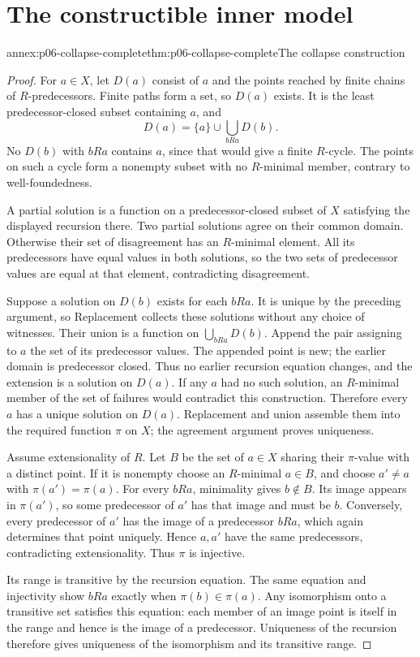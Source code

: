 \section{The constructible inner model}
\label{sec:annex-p06-constructible-inner-model-completion}

\begin{annexitem}{annex:p06-collapse-complete}{thm:p06-collapse-complete}{The collapse construction}
\begin{proof}
For \(a\in X\), let \(D(a)\) consist of \(a\) and the points reached
by finite chains of \(R\)-predecessors.
Finite paths form a set, so \(D(a)\) exists.
It is the least predecessor-closed subset containing \(a\), and
\[
 D(a)=\{a\}\cup\bigcup_{bRa}D(b).
\]
No \(D(b)\) with \(bRa\) contains \(a\), since that would give a
finite \(R\)-cycle. The points on such a cycle form a nonempty
subset with no \(R\)-minimal member, contrary to well-foundedness.

A partial solution is a function on a predecessor-closed subset
of \(X\) satisfying the displayed recursion there.
Two partial solutions agree on their common domain.
Otherwise their set of disagreement has an \(R\)-minimal element.
All its predecessors have equal values in both solutions, so the
two sets of predecessor values are equal at that element,
contradicting disagreement.

Suppose a solution on \(D(b)\) exists for each \(bRa\).
It is unique by the preceding argument, so Replacement collects
these solutions without any choice of witnesses.
Their union is a function on \(\bigcup_{bRa}D(b)\).
Append the pair assigning to \(a\) the set of its predecessor values.
The appended point is new; the earlier domain is predecessor closed.
Thus no earlier recursion equation changes, and the extension is
a solution on \(D(a)\).
If any \(a\) had no such solution, an \(R\)-minimal member of
the set of failures would contradict this construction.
Therefore every \(a\) has a unique solution on \(D(a)\).
Replacement and union assemble them into the required function
\(\pi\) on \(X\); the agreement argument proves uniqueness.

Assume extensionality of \(R\).
Let \(B\) be the set of \(a\in X\) sharing their \(\pi\)-value
with a distinct point. If it is nonempty choose an \(R\)-minimal
\(a\in B\), and choose \(a'\neq a\) with \(\pi(a')=\pi(a)\).
For every \(bRa\), minimality gives \(b\notin B\).
Its image appears in \(\pi(a')\), so some predecessor of \(a'\)
has that image and must be \(b\).
Conversely, every predecessor of \(a'\) has the image of a
predecessor \(bRa\), which again determines that point uniquely.
Hence \(a,a'\) have the same predecessors, contradicting
extensionality. Thus \(\pi\) is injective.

Its range is transitive by the recursion equation.
The same equation and injectivity show
\(bRa\) exactly when \(\pi(b)\in\pi(a)\).
Any isomorphism onto a transitive set satisfies this equation:
each member of an image point is itself in the range and hence
is the image of a predecessor.
Uniqueness of the recursion therefore gives uniqueness of the
isomorphism and its transitive range.
\end{proof}
\end{annexitem}

